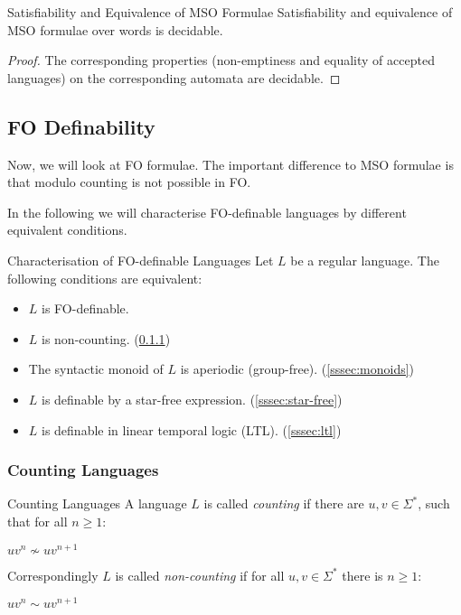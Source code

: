 \documentclass[english]{panikzettel}
\begin{document}
\begin{theo}{Satisfiability and Equivalence of MSO Formulae}
    Satisfiability and equivalence of MSO formulae over words is decidable.
\end{theo}
\begin{proof}
    The corresponding properties (non-emptiness and equality of accepted languages) on the corresponding automata are decidable.
\end{proof}

\subsection{FO Definability}
Now, we will look at FO formulae. The important difference to MSO formulae is that modulo counting is not possible in FO.

In the following we will characterise FO-definable languages by different equivalent conditions.

\begin{theo}{Characterisation of FO-definable Languages}
Let $L$ be a regular language. The following conditions are equivalent:
\begin{itemize}
    \item $L$ is FO-definable.
    \item $L$ is non-counting. (\ref{sssec:counting})
    \item The syntactic monoid of $L$ is aperiodic (group-free). (\ref{sssec:monoids})
    \item $L$ is definable by a star-free expression. (\ref{sssec:star-free})
    \item $L$ is definable in linear temporal logic (LTL). (\ref{sssec:ltl})
\end{itemize}
\end{theo}

\subsubsection{Counting Languages}
\label{sssec:counting}
\begin{defi}{Counting Languages}
    A language $L$ is called \emph{counting} if there are $u,v \in \Sigma^*$, such that for all $n \geq 1$:
    \begin{tightcenter}
        $uv^n \nsim uv^{n+1}$
    \end{tightcenter}

    Correspondingly $L$ is called \emph{non-counting} if for all $u,v \in \Sigma^*$ there is $n \geq 1$:
    \begin{tightcenter}
        $uv^n \sim uv^{n+1}$
    \end{tightcenter}
\end{defi}
\end{document}
